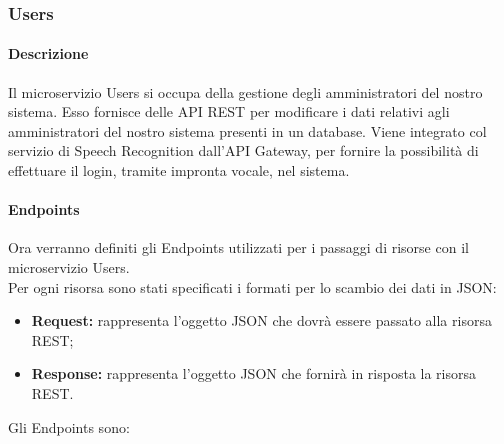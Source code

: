 \subsubsection{Users}
\paragraph{Descrizione}
Il microservizio Users si occupa della gestione degli amministratori del nostro sistema. Esso fornisce delle API REST per modificare i dati relativi agli amministratori del nostro sistema presenti in un database. Viene integrato col servizio di Speech Recognition dall'API Gateway, per fornire la possibilità di effettuare il login, tramite impronta vocale, nel sistema.
\paragraph{Endpoints}

Ora verranno definiti gli Endpoints utilizzati per i passaggi di risorse con il microservizio Users. \\
Per ogni risorsa sono stati specificati i formati per lo scambio dei dati in JSON:
\begin{itemize}
\item \textbf{Request:} rappresenta l’oggetto JSON che dovrà essere passato alla risorsa REST;
\item \textbf{Response:} rappresenta l’oggetto JSON che fornirà in risposta la risorsa REST.
\end{itemize}

Gli Endpoints sono:

